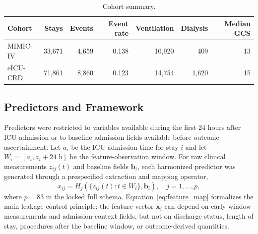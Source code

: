 \documentclass[utf8]{FrontiersinVancouver}
\begin{document}
\begin{table}[htbp]
\centering
\caption{Cohort summary.}
\label{tab:cohort}
\begin{tabular}{lrrrrrr}
\toprule
Cohort & Stays & Events & Event rate & Ventilation & Dialysis & Median GCS\\
\midrule
MIMIC-IV & 33,671 & 4,659 & 0.138 & 10,920 & 409 & 13\\
eICU-CRD & 71,861 & 8,860 & 0.123 & 14,754 & 1,620 & 15\\
\bottomrule
\end{tabular}
\end{table}

\subsection{Predictors and Framework}
Predictors were restricted to variables available during the first 24 hours after ICU admission or to baseline admission fields available before outcome ascertainment. Let $a_i$ be the ICU admission time for stay $i$ and let $W_i=[a_i,a_i+24\text{ h}]$ be the feature-observation window. For raw clinical measurements $z_{ij}(t)$ and baseline fields $\mathbf{b}_{i}$, each harmonized predictor was generated through a prespecified extraction and mapping operator,
\begin{equation}
x_{ij}=H_j\left(\{z_{ij}(t):t\in W_i\},\mathbf{b}_{i}\right),\quad j=1,\ldots,p,
\label{eq:feature_map}
\end{equation}
where $p=83$ in the locked full schema. Equation~\ref{eq:feature_map} formalizes the main leakage-control principle: the feature vector $\mathbf{x}_{i}$ can depend on early-window measurements and admission-context fields, but not on discharge status, length of stay, procedures after the baseline window, or outcome-derived quantities.
\end{document}
